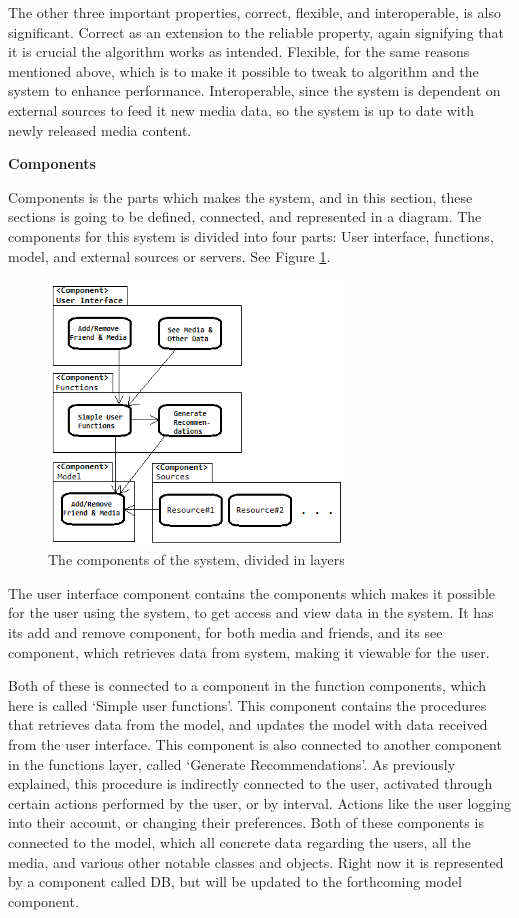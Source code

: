 The other three important properties, correct, flexible, and interoperable, is also significant. Correct as an extension to the reliable property, again signifying that it is crucial the algorithm works as intended. Flexible, for the same reasons mentioned above, which is to make it possible to tweak to algorithm and the system to enhance performance. Interoperable, since the system is dependent on external sources to feed it new media data, so the system is up to date with newly released media content.

\textbf{Components}

Components is the parts which makes the system, and in this section, these sections is going to be defined, connected, and represented in a diagram. The components for this system is divided into four parts: User interface, functions, model, and external sources or servers. See Figure \ref{Components}.

\begin{figure}[htb]
\centering
\includegraphics[width=0.7\textwidth]{Images/Components.png}
\caption{The components of the system, divided in layers}
\label{Components}
\end{figure}

The user interface component contains the components which makes it possible for the user using the system, to get access and view data in the system. It has its add and remove component, for both media and friends, and its see component, which retrieves data from system, making it viewable for the user.

Both of these is connected to a component in the function components, which here is called ‘Simple user functions’. This component contains the procedures that retrieves data from the model, and updates the model with data received from the user interface. This component is also connected to another component in the functions layer, called ‘Generate Recommendations’. As previously explained, this procedure is indirectly connected to the user, activated through certain actions performed by the user, or by interval. Actions like the user logging into their account, or changing their preferences.
Both of these components is connected to the model, which all concrete data regarding the users, all the media, and various other notable classes and objects. Right now it is represented by a component called DB, but will be updated to the forthcoming model component.

